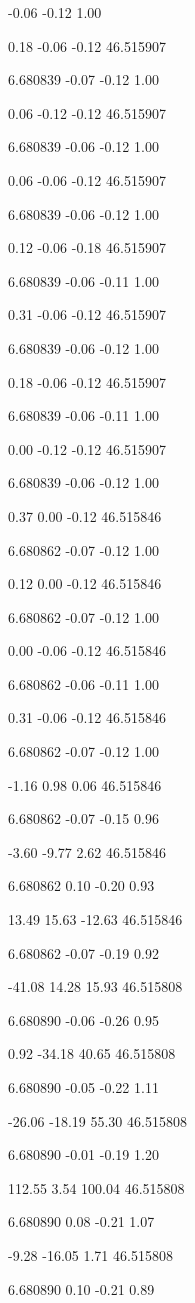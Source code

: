 -0.06
-0.12
1.00

0.18
-0.06
-0.12
46.515907

6.680839
-0.07
-0.12
1.00

0.06
-0.12
-0.12
46.515907

6.680839
-0.06
-0.12
1.00

0.06
-0.06
-0.12
46.515907

6.680839
-0.06
-0.12
1.00

0.12
-0.06
-0.18
46.515907

6.680839
-0.06
-0.11
1.00

0.31
-0.06
-0.12
46.515907

6.680839
-0.06
-0.12
1.00

0.18
-0.06
-0.12
46.515907

6.680839
-0.06
-0.11
1.00

0.00
-0.12
-0.12
46.515907

6.680839
-0.06
-0.12
1.00

0.37
0.00
-0.12
46.515846

6.680862
-0.07
-0.12
1.00

0.12
0.00
-0.12
46.515846

6.680862
-0.07
-0.12
1.00

0.00
-0.06
-0.12
46.515846

6.680862
-0.06
-0.11
1.00

0.31
-0.06
-0.12
46.515846

6.680862
-0.07
-0.12
1.00

-1.16
0.98
0.06
46.515846

6.680862
-0.07
-0.15
0.96

-3.60
-9.77
2.62
46.515846

6.680862
0.10
-0.20
0.93

13.49
15.63
-12.63
46.515846

6.680862
-0.07
-0.19
0.92

-41.08
14.28
15.93
46.515808

6.680890
-0.06
-0.26
0.95

0.92
-34.18
40.65
46.515808

6.680890
-0.05
-0.22
1.11

-26.06
-18.19
55.30
46.515808

6.680890
-0.01
-0.19
1.20

112.55
3.54
100.04
46.515808

6.680890
0.08
-0.21
1.07

-9.28
-16.05
1.71
46.515808

6.680890
0.10
-0.21
0.89

